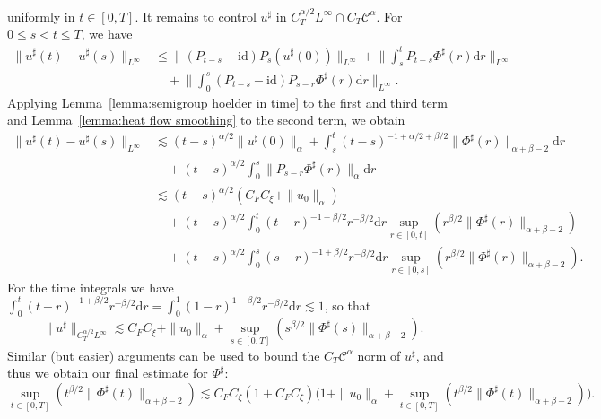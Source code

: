 \documentclass[11pt,a4paper]{article}
\newcommand{\mathd}{\mathrm{d}}
\theoremstyle{remark}
\newcommand{\CC}{\ensuremath{\mathscr{C}}}
\begin{document}
uniformly in $t \in [ 0,T ]$. It remains to control $u^\sharp$ in $C^{\alpha/2}_TL^\infty \cap C_T \CC^\alpha$. For $0\leqslant s < t \leqslant T$, we have
\begin{align*}
   \| u^\sharp(t) - u^\sharp(s)\|_{L^\infty} & \leqslant \|(P_{t-s} - \mathrm{id}) P_s (u^\sharp(0))\|_{L^\infty} + \bigg\| \int_s^t P_{t-s} \Phi^\sharp(r) \mathd r \bigg\|_{L^\infty} \\
   &\quad + \bigg\| \int_0^s (P_{t-s} - \mathrm{id}) P_{s-r} \Phi^\sharp(r) \mathd r \bigg\|_{L^\infty}.
\end{align*}
Applying Lemma~\ref{lemma:semigroup hoelder in time} to the first and third term and Lemma~\ref{lemma:heat flow smoothing} to the second term, we obtain
\begin{align*}
   \| u^\sharp(t) - u^\sharp(s)\|_{L^\infty} & \lesssim (t-s)^{\alpha/2} \|u^\sharp(0)\|_{\alpha} + \int_s^t (t-s)^{-1+\alpha/2+\beta/2} \|\Phi^\sharp(r)\|_{\alpha+\beta-2} \mathd r \\
   &\quad + (t-s)^{\alpha/2} \int_0^s \| P_{s-r} \Phi^\sharp(r) \|_{\alpha} \mathd r \\
   &\lesssim (t-s)^{\alpha/2} (C_F C_\xi + \|u_0\|_\alpha) \\
   &\quad + (t-s)^{\alpha/2} \int_0^t (t-r)^{-1+\beta/2} r^{-\beta/2} \mathd r \sup_{r \in [ 0,t ]} ( r^{\beta /2} \| \Phi^{\sharp} ( r ) \|_{\alpha + \beta -2} ) \\
   &\quad + (t-s)^{\alpha/2} \int_0^s (s-r)^{-1+\beta/2} r^{-\beta/2}\mathd r \sup_{r \in [ 0,s ]} ( r^{\beta /2} \| \Phi^{\sharp} ( r ) \|_{\alpha + \beta -2} ).
\end{align*}
For the time integrals we have
$\int_{0}^{t} ( t-r )^{-1+ \beta /2} r^{-\beta /2} \mathd r = \int_{0}^{1} ( 1-r )^{1- \beta /2} r^{-\beta /2} \mathd r \lesssim 1$,
so that
\[
   \|u^\sharp\|_{C^{\alpha/2}_TL^\infty} \lesssim C_F C_\xi + \|u_0\|_\alpha + \sup_{s \in [ 0,T]} ( s^{\beta /2} \| \Phi^{\sharp} ( s ) \|_{\alpha + \beta -2} ).
\]
Similar (but easier) arguments can be used to bound the $C_T\CC^\alpha$ norm of $u^\sharp$, and thus we obtain our final estimate for $\Phi^\sharp$:
\begin{equation}\label{eq:pam phi sharp final estimate}
    \sup_{t \in [ 0,T]} (t^{\beta /2} \| \Phi^{\sharp} ( t ) \|_{\alpha+\beta -2}) \lesssim C_F C_\xi (1+C_FC_\xi) \Big( 1 + \|u_0\|_\alpha + \sup_{t \in [ 0,T ]} (t^{\beta /2} \| \Phi^{\sharp} ( t ) \|_{\alpha + \beta - 2}) \Big).
\end{equation}
%
%
%
\end{document}
